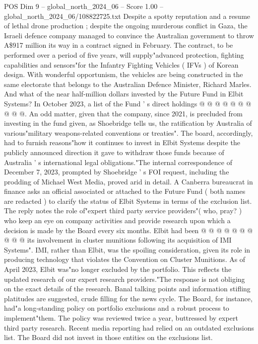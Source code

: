 \begin{textsample}{POS Dim 9 – global\_north\_2024\_06 – Score 1.00 – global\_north\_2024\_06/108822725.txt}
Despite a spotty reputation and a resume of lethal drone production ; despite the ongoing murderous conflict in Gaza, the Israeli defence company managed to convince the Australian government to throw A\$917 million its way in a contract signed in February.
The contract, to be performed over a period of five years, will supply"advanced protection, fighting capabilities and sensors"for the Infantry Fighting Vehicles ( IFVs ) of Korean design.
With wonderful opportunism, the vehicles are being constructed in the same electorate that belongs to the Australian Defence Minister, Richard Marles.
And what of the near half-million dollars invested by the Future Fund in Elbit Systems?
In October 2023, a list of the Fund ' s direct holdings @ @ @ @ @ @ @ @ @ @.
An odd matter, given that the company, since 2021, is precluded from investing in the fund given, as Shoebridge tells us, the ratification by Australia of various"military weapons-related conventions or treaties".
The board, accordingly, had to furnish reasons"how it continues to invest in Elbit Systems despite the publicly announced direction it gave to withdraw those funds because of Australia ' s international legal obligations."The internal correspondence of December 7, 2023, prompted by Shoebridge ' s FOI request, including the prodding of Michael West Media, proved arid in detail.
A Canberra bureaucrat in finance asks an official associated or attached to the Future Fund ( both names are redacted ) to clarify the status of Elbit Systems in terms of the exclusion list.
The reply notes the role of"expert third party service providers"( who, pray? ) who keep an eye on company activities and provide research upon which a decision is made by the Board every six months.
Elbit had been @ @ @ @ @ @ @ @ @ @ its involvement in cluster munitions following its acquisition of IMI Systems".
IMI, rather than Elbit, was the spoiling consideration, given its role in producing technology that violates the Convention on Cluster Munitions.
As of April 2023, Elbit was"no longer excluded by the portfolio.
This reflects the updated research of our expert research providers."The response is not obliging on the exact details of the research.
Banal talking points and information stifling platitudes are suggested, crude filling for the news cycle.
The Board, for instance, had"a long-standing policy on portfolio exclusions and a robust process to implement"them.
The policy was reviewed twice a year, buttressed by expert third party research.
Recent media reporting had relied on an outdated exclusions list.
The Board did not invest in those entities on the exclusions list.

\end{textsample}
